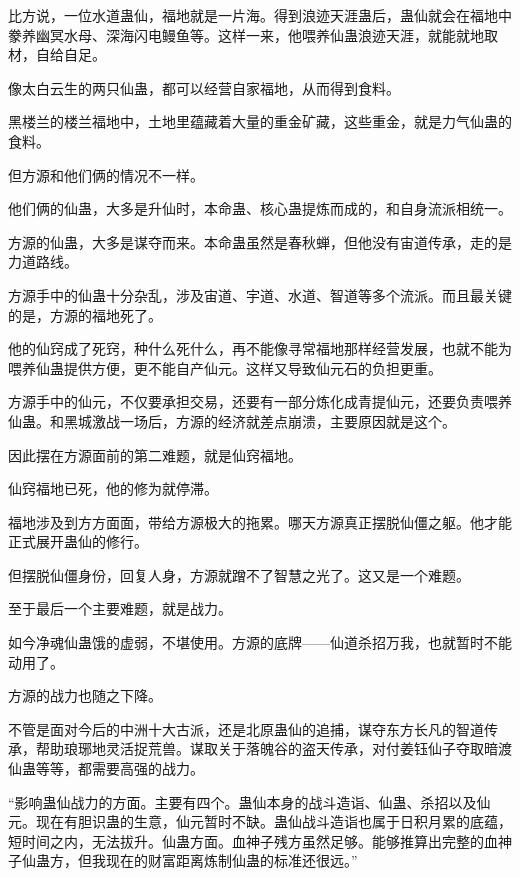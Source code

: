 
\begin{this_body}

比方说，一位水道蛊仙，福地就是一片海。得到浪迹天涯蛊后，蛊仙就会在福地中豢养幽冥水母、深海闪电鳗鱼等。这样一来，他喂养仙蛊浪迹天涯，就能就地取材，自给自足。

像太白云生的两只仙蛊，都可以经营自家福地，从而得到食料。

黑楼兰的楼兰福地中，土地里蕴藏着大量的重金矿藏，这些重金，就是力气仙蛊的食料。

但方源和他们俩的情况不一样。

他们俩的仙蛊，大多是升仙时，本命蛊、核心蛊提炼而成的，和自身流派相统一。

方源的仙蛊，大多是谋夺而来。本命蛊虽然是春秋蝉，但他没有宙道传承，走的是力道路线。

方源手中的仙蛊十分杂乱，涉及宙道、宇道、水道、智道等多个流派。而且最关键的是，方源的福地死了。

他的仙窍成了死窍，种什么死什么，再不能像寻常福地那样经营发展，也就不能为喂养仙蛊提供方便，更不能自产仙元。这样又导致仙元石的负担更重。

方源手中的仙元，不仅要承担交易，还要有一部分炼化成青提仙元，还要负责喂养仙蛊。和黑城激战一场后，方源的经济就差点崩溃，主要原因就是这个。

因此摆在方源面前的第二难题，就是仙窍福地。

仙窍福地已死，他的修为就停滞。

福地涉及到方方面面，带给方源极大的拖累。哪天方源真正摆脱仙僵之躯。他才能正式展开蛊仙的修行。

但摆脱仙僵身份，回复人身，方源就蹭不了智慧之光了。这又是一个难题。

至于最后一个主要难题，就是战力。

如今净魂仙蛊饿的虚弱，不堪使用。方源的底牌——仙道杀招万我，也就暂时不能动用了。

方源的战力也随之下降。

不管是面对今后的中洲十大古派，还是北原蛊仙的追捕，谋夺东方长凡的智道传承，帮助琅琊地灵活捉荒兽。谋取关于落魄谷的盗天传承，对付姜钰仙子夺取暗渡仙蛊等等，都需要高强的战力。

“影响蛊仙战力的方面。主要有四个。蛊仙本身的战斗造诣、仙蛊、杀招以及仙元。现在有胆识蛊的生意，仙元暂时不缺。蛊仙战斗造诣也属于日积月累的底蕴，短时间之内，无法拔升。仙蛊方面。血神子残方虽然足够。能够推算出完整的血神子仙蛊方，但我现在的财富距离炼制仙蛊的标准还很远。”


\end{this_body}
